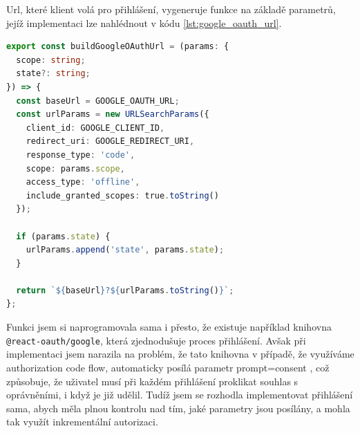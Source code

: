Url, které klient volá pro přihlášení, vygeneruje funkce na základě parametrů, jejíž implementaci lze nahlédnout v kódu \ref{lst:google_oauth_url}.

\begin{lstlisting}[language=TypeScript, label={lst:google_oauth_url}, caption={Funkce pro generování url pro přihlášení přes Google OAuth.}]
export const buildGoogleOAuthUrl = (params: {
  scope: string;
  state?: string;
}) => {
  const baseUrl = GOOGLE_OAUTH_URL;
  const urlParams = new URLSearchParams({
    client_id: GOOGLE_CLIENT_ID,
    redirect_uri: GOOGLE_REDIRECT_URI,
    response_type: 'code',
    scope: params.scope,
    access_type: 'offline',
    include_granted_scopes: true.toString()
  });

  if (params.state) {
    urlParams.append('state', params.state);
  }

  return `${baseUrl}?${urlParams.toString()}`;
};
\end{lstlisting}

Funkci jsem si naprogramovala sama i přesto, že existuje například knihovna \texttt{@react-oauth/google}, která zjednodušuje proces přihlášení. Avšak při implementaci jsem narazila na problém, že tato knihovna v případě, že využíváme authorization code flow, automaticky posílá parametr prompt=consent \cite{google_openid_reconsent}, což způsobuje, že uživatel musí při každém přihlášení proklikat souhlas s oprávněními, i když je již udělil. Tudíž jsem se rozhodla implementovat přihlášení sama, abych měla plnou kontrolu nad tím, jaké parametry jsou posílány, a mohla tak využít inkrementální autorizaci.

